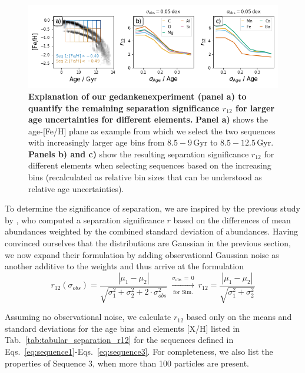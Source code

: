 \documentclass[fleqn,usenatbib]{mnras}
\begin{document}
\begin{figure}
	\includegraphics[width=\columnwidth]{figures/age_sigma_vs_r.png}
    \caption{
    \textbf{Explanation of our gedankenexperiment (panel a) to quantify the remaining separation significance $r_{12}$ for larger age uncertainties for different elements.}
    \textbf{Panel a)} shows the age-{[Fe/H]} plane as example from which we select the two sequences with increasingly larger age bins from $8.5-9\,\mathrm{Gyr}$ to $8.5-12.5\,\mathrm{Gyr}$. \textbf{Panels b) and c)} show the resulting separation significance $r_{12}$ for different elements when selecting sequences based on the increasing bins (recalculated as relative bin sizes that can be understood as relative age uncertainties).
    }
    \label{fig:age_sigma_vs_r}
\end{figure}

To determine the significance of separation, we are inspired by the previous study by \citet{Lindegren2013}, who computed a separation significance $r$ based on the differences of mean abundances weighted by the combined standard deviation of abundances. Having convinced ourselves that the distributions are Gaussian in the previous section, we now expand their formulation by adding observational Gaussian noise as another additive to the weights and thus arrive at the formulation
\begin{equation} \label{eq:r_value}
r_{12} (\sigma_{obs}) = \frac{|\mu_1 - \mu_2|}{\sqrt{\sigma_1^2 + \sigma_2^2 + 2\cdot \sigma_{obs}^2}} ~ \xrightarrow[\text{for Sim.}]{\sigma_\text{obs}\,=\,0} ~ r_{12} = \frac{|\mu_1 - \mu_2|}{\sqrt{\sigma_1^2 + \sigma_2^2}}
\end{equation}

Assuming no observational noise, we calculate $r_{12}$ based only on the means and standard deviations for the age bins and elements {[X/H]} listed in Tab.~\ref{tab:tabular_separation_r12} for the sequences defined in Eqs.~\ref{eq:sequence1}-Eqs.~\ref{eq:sequence3}. For completeness, we also list the properties of Sequence 3, when more than 100 particles are present.
\end{document}
